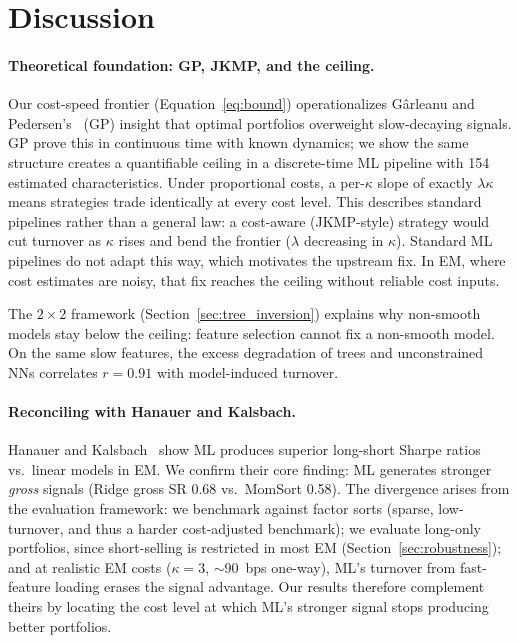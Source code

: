 \documentclass[sigconf,balance=false]{acmart}
\begin{document}
\section{Discussion}

\paragraph{Theoretical foundation: GP, JKMP, and the ceiling.}
Our cost-speed frontier (Equation~\ref{eq:bound}) operationalizes
G\^{a}rleanu and Pedersen's~\cite{garleanu2013dynamic} (GP) insight
that optimal portfolios overweight slow-decaying signals. GP prove this
in continuous time with known dynamics; we show the same structure
creates a quantifiable ceiling in a discrete-time ML pipeline with
154 estimated characteristics. Under proportional costs, a
per-$\kappa$ slope of exactly $\lambda\kappa$ means strategies trade
identically at every cost level. This describes standard pipelines
rather than a general law: a cost-aware (JKMP-style) strategy would
cut turnover as $\kappa$ rises and bend the frontier ($\lambda$
decreasing in $\kappa$). Standard ML pipelines do not adapt this way,
which motivates the upstream fix. In EM, where cost estimates are
noisy, that fix reaches the ceiling without reliable cost inputs.

The $2 \times 2$ framework (Section~\ref{sec:tree_inversion}) explains
why non-smooth models stay below the ceiling: feature selection cannot
fix a non-smooth model. On the same slow features, the excess
degradation of trees and unconstrained NNs correlates $r = 0.91$ with
model-induced turnover.

\paragraph{Reconciling with Hanauer and Kalsbach.}
Hanauer and Kalsbach~\cite{hanauer2023machine} show ML produces superior
long-short Sharpe ratios vs.\ linear models in EM. We confirm their
core finding: ML generates stronger \emph{gross} signals (Ridge gross
SR 0.68 vs.\ MomSort 0.58). The divergence arises from the evaluation
framework: we benchmark against factor sorts (sparse, low-turnover,
and thus a harder cost-adjusted benchmark); we evaluate long-only
portfolios, since short-selling is restricted in most EM
(Section~\ref{sec:robustness}); and at
realistic EM costs ($\kappa = 3$, $\sim$90~bps one-way), ML's turnover
from fast-feature loading erases the signal advantage. Our results
therefore complement theirs by locating the cost level at which ML's
stronger signal stops producing better portfolios.
\end{document}
